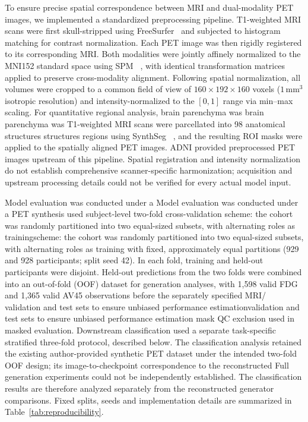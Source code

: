 \documentclass{article}
\providecommand{\DIFaddtex}[1]{{\protect\color{blue} \sf #1}} %
\providecommand{\DIFdeltex}[1]{{\protect\color{red} \ifmmode #1\else\scriptsize #1\fi}} %
\providecommand{\DIFaddbegin}{} %
\providecommand{\DIFaddend}{} %
\providecommand{\DIFdelbegin}{} %
\providecommand{\DIFdelend}{} %
\providecommand{\DIFadd}[1]{\texorpdfstring{\DIFaddtex{#1}}{#1}} %
\providecommand{\DIFdel}[1]{\texorpdfstring{\DIFdeltex{#1}}{}} %
\newcommand{\DIFscaledelfig}{0.5}
\newlength{\DIFdelgraphicswidth} %
\newlength{\DIFdelgraphicsheight} %
\newcommand{\DIFaddincludegraphics}[2][]{{\color{blue}\fbox{\DIFOincludegraphics[#1]{#2}}}} %
\newcommand{\DIFdelincludegraphics}[2][]{%
\sbox{\DIFdelgraphicsbox}{\DIFOincludegraphics[#1]{#2}}%
\settoboxwidth{\DIFdelgraphicswidth}{\DIFdelgraphicsbox} %
\settoboxtotalheight{\DIFdelgraphicsheight}{\DIFdelgraphicsbox} %
\scalebox{\DIFscaledelfig}{%
\parbox[b]{\DIFdelgraphicswidth}{\usebox{\DIFdelgraphicsbox}\\[-\baselineskip] \rule{\DIFdelgraphicswidth}{0em}}\llap{\resizebox{\DIFdelgraphicswidth}{\DIFdelgraphicsheight}{%
\setlength{\unitlength}{\DIFdelgraphicswidth}%
\begin{picture}(1,1)%
\thicklines\linethickness{2pt} %
{\color[rgb]{1,0,0}\put(0,0){\framebox(1,1){}}}%
{\color[rgb]{1,0,0}\put(0,0){\line( 1,1){1}}}%
{\color[rgb]{1,0,0}\put(0,1){\line(1,-1){1}}}%
\end{picture}%
}\hspace*{3pt}}} %
} %
\DeclareRobustCommand{\DIFaddbegin}{\DIFOaddbegin \let\includegraphics\DIFaddincludegraphics} %
\DeclareRobustCommand{\DIFaddend}{\DIFOaddend \let\includegraphics\DIFOincludegraphics} %
\DeclareRobustCommand{\DIFdelbegin}{\DIFOdelbegin \let\includegraphics\DIFdelincludegraphics} %
\DeclareRobustCommand{\DIFdelend}{\DIFOaddend \let\includegraphics\DIFOincludegraphics} %
\begin{document}
To ensure precise spatial correspondence between MRI and dual-modality PET images, we implemented a standardized preprocessing pipeline. T1-weighted MRI scans were first skull-stripped using FreeSurfer~\cite{Freesurfer} and subjected to histogram matching for contrast normalization. Each PET image was then rigidly registered to its corresponding MRI. Both modalities were jointly affinely normalized to the MNI152 standard space using SPM~\DIFdelbegin \DIFdel{\cite{spm}}\DIFdelend \DIFaddbegin \DIFadd{\cite{spm,friston1995spatial}}\DIFaddend , with identical transformation matrices applied to preserve cross-modality alignment. Following spatial normalization, all volumes were cropped to a common field of view of $160 \times 192 \times 160$ voxels ($1\,\text{mm}^3$ isotropic resolution) and intensity-normalized to the $[0, 1]$ range via min–max scaling. For quantitative regional analysis, \DIFdelbegin \DIFdel{brain parenchyma was }\DIFdelend \DIFaddbegin \DIFadd{T1-weighted MRI scans were }\DIFaddend parcellated into 98 anatomical \DIFdelbegin \DIFdel{structures }\DIFdelend \DIFaddbegin \DIFadd{regions }\DIFaddend using SynthSeg~\cite{synthseg}\DIFaddbegin \DIFadd{, and the resulting ROI masks were applied to the spatially aligned PET images. ADNI provided preprocessed PET images upstream of this pipeline. Spatial registration and intensity normalization do not establish comprehensive scanner-specific harmonization; acquisition and upstream processing details could not be verified for every actual model input}\DIFaddend .

\DIFdelbegin \DIFdel{Model evaluation was conducted under a }\DIFdelend \DIFaddbegin \DIFadd{PET synthesis used subject-level }\DIFaddend two-fold cross-validation \DIFdelbegin \DIFdel{scheme: the cohort was randomly partitioned into two equal-sized subsets, with alternating roles as training}\DIFdelend \DIFaddbegin \DIFadd{with fixed, approximately equal partitions (929 and 928 participants; split seed 42). In each fold, training and held-out participants were disjoint. Held-out predictions from the two folds were combined into an out-of-fold (OOF) dataset for generation analyses, with 1,598 valid FDG and 1,365 valid AV45 observations before the separately specified MRI}\DIFaddend /\DIFdelbegin \DIFdel{validation and test sets to ensure unbiased performance estimation}\DIFdelend \DIFaddbegin \DIFadd{mask QC exclusion used in masked evaluation. Downstream classification used a separate task-specific stratified three-fold protocol, described below. The classification analysis retained the existing author-provided synthetic PET dataset under the intended two-fold OOF design; its image-to-checkpoint correspondence to the reconstructed Full generation experiments could not be independently established. The classification results are therefore analyzed separately from the reconstructed generator comparisons. Fixed splits, seeds and implementation details are summarized in Table~\ref{tab:reproducibility}}\DIFaddend .
\end{document}
